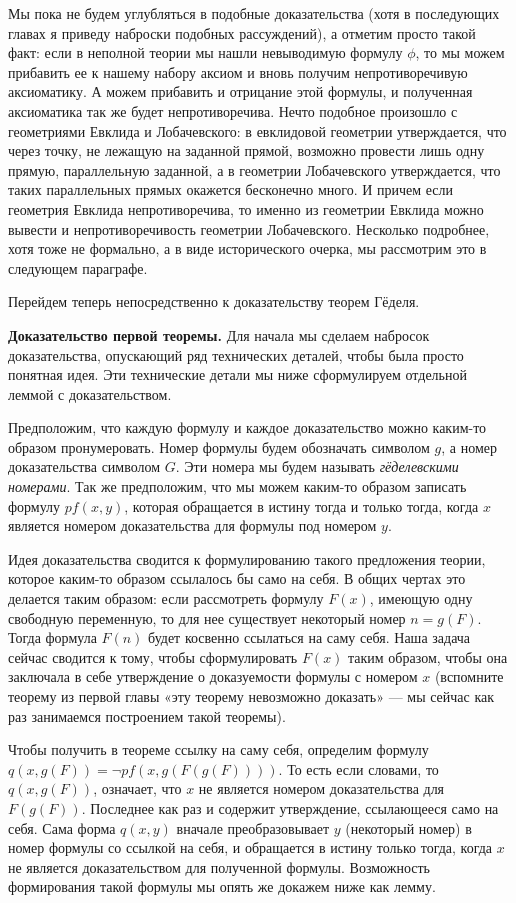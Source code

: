 Мы пока не будем углубляться в подобные доказательства (хотя в последующих главах я приведу наброски подобных рассуждений), а отметим просто такой факт: если в неполной теории мы нашли невыводимую формулу $\phi$, то мы можем прибавить ее к нашему набору аксиом и вновь получим непротиворечивую аксиоматику. А можем прибавить и отрицание этой формулы, и полученная аксиоматика так же будет непротиворечива. Нечто подобное произошло с геометриями Евклида и Лобачевского: в евклидовой геометрии утверждается, что через точку, не лежащую на заданной прямой, возможно провести лишь одну прямую, параллельную заданной, а в геометрии Лобачевского утверждается, что таких параллельных прямых окажется бесконечно много. И причем если геометрия Евклида непротиворечива, то именно из геометрии Евклида можно вывести и непротиворечивость геометрии Лобачевского. Несколько подробнее, хотя тоже не формально, а в виде исторического очерка, мы рассмотрим это в следующем параграфе.

Перейдем теперь непосредственно к доказательству теорем Гёделя.

{\bfseries Доказательство первой теоремы.} Для начала мы сделаем набросок доказательства, опускающий ряд технических деталей, чтобы была просто понятная идея. Эти технические детали мы ниже сформулируем отдельной леммой с доказательством.

Предположим, что каждую формулу и каждое доказательство можно каким-то образом пронумеровать. Номер формулы  будем обозначать символом $g$, а номер доказательства символом $G$. Эти номера мы будем называть {\slshape гёделевскими номерами}. Так же предположим, что мы можем каким-то образом записать формулу $pf(x, y)$, которая обращается в истину тогда и только тогда, когда $x$ является номером доказательства для формулы под номером $y$.

Идея доказательства  сводится к формулированию такого предложения теории, которое каким-то образом ссылалось бы само на себя. В общих чертах это делается таким образом: если рассмотреть формулу $F(x)$, имеющую одну свободную переменную, то для нее существует некоторый номер $n=g(F)$. Тогда формула $F(n)$ будет косвенно ссылаться на саму себя. Наша задача сейчас сводится к тому, чтобы сформулировать $F(x)$ таким образом, чтобы она заключала в себе утверждение о доказуемости формулы с номером $x$ (вспомните теорему из первой главы «эту теорему невозможно доказать» — мы сейчас как раз занимаемся построением такой теоремы).

Чтобы получить в теореме ссылку на саму себя, определим формулу $q(x, g(F)) = \neg pf(x, g(F(g(F))))$. То есть если словами, то $q(x, g(F))$, означает, что $x$ не является номером доказательства для $F(g(F))$. Последнее как раз и содержит утверждение, ссылающееся само на себя. Сама форма $q(x, y)$ вначале преобразовывает $y$ (некоторый номер) в номер формулы со ссылкой на себя, и обращается в истину только тогда, когда $x$ не является доказательством для полученной формулы. Возможность формирования такой формулы мы опять же докажем ниже как лемму.

